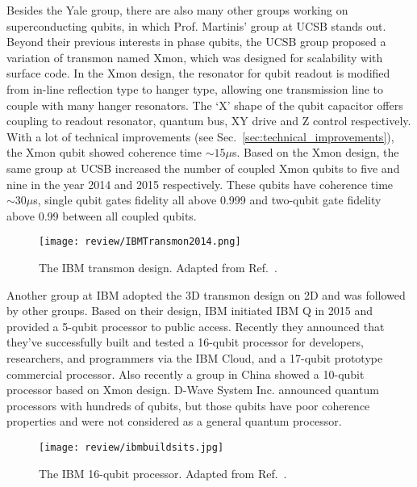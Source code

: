 Besides the Yale group, there are also many other groups working on superconducting qubits, in which Prof. Martinis' group at UCSB stands out. Beyond their previous interests in phase qubits, the UCSB group proposed a variation of transmon named Xmon\cite{Barends2013Coherent}, which was designed for scalability with surface code\cite{Fowler2012}. In the Xmon design, the resonator for qubit readout is modified from in-line reflection type to hanger type, allowing one transmission line to couple with many hanger resonators. The `X' shape of the qubit capacitor offers coupling to readout resonator, quantum bus, XY drive and Z control respectively. With a lot of technical improvements (see Sec.~\ref{sec:technical_improvements}), the Xmon qubit showed coherence time $\sim 15\mu$s. Based on the Xmon design, the same group at UCSB increased the number of coupled Xmon qubits to five\cite{Barends2014} and nine\cite{Kelly2015} in the year 2014 and 2015 respectively. These qubits have coherence time $\sim 30\mu$s, single qubit gates fidelity all above 0.999 and two-qubit gate fidelity above 0.99 between all coupled qubits.


            \begin{figure}[h]
                \centering
                \texttt{[image: review/IBMTransmon2014.png]}
                \caption{The IBM transmon design. Adapted from Ref.~.}
                \label{fig:IBMTransmon2014}
            \end{figure}


Another group at IBM adopted the 3D transmon design on 2D\cite{Chow2014,Takita2017} and was followed by other groups\cite{Mlynek2014,Pechal2016,Walter2017}. Based on their design, IBM initiated IBM Q in 2015 and provided a 5-qubit processor to public access\cite{IBMQ}. Recently they announced that they've successfully built and tested a 16-qubit processor for developers, researchers, and programmers via the IBM Cloud, and a 17-qubit prototype commercial processor\cite{IBM16QubitsOriginal}. Also recently a group in China showed a 10-qubit processor based on Xmon design\cite{Song2017}. D-Wave System Inc. announced quantum processors with hundreds of qubits\cite{Shin2014}, but those qubits have poor coherence properties and were not considered as a general quantum processor\cite{devoret2013superconducting}.



            \begin{figure}[h]
                \centering
                \texttt{[image: review/ibmbuildsits.jpg]}
                \caption{The IBM 16-qubit processor. Adapted from Ref.~.}
                \label{fig:ibmbuildsits}
            \end{figure}


